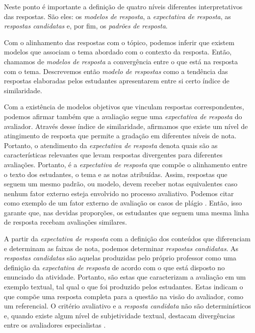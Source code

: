 Neste ponto é importante a definição de quatro níveis diferentes interpretativos das respostas. São eles: os \textit{modelos de resposta}, a \textit{expectativa de resposta}, as \textit{respostas candidatas} e, por fim, os \textit{padrões de resposta}. 


Com o alinhamento das respostas com o tópico, podemos inferir que existem modelos que associam o tema abordado com o contexto da resposta. Então, chamamos de \textit{modelos de resposta} a convergência entre o que está na resposta com o tema. Descrevemos então \textit{modelo de respostas} como a tendência das respostas elaboradas pelos estudantes apresentarem entre si certo índice de similaridade.

Com a existência de modelos objetivos que vinculam respostas correspondentes, podemos afirmar também que a avaliação segue uma \textit{expectativa de resposta} do avaliador. Através desse índice de similaridade, afirmamos que existe um nível de atingimento de resposta que permite a gradação em diferentes níveis de nota. Portanto, o atendimento da \textit{expectativa de resposta} denota quais são as características relevantes que levam respostas divergentes para  diferentes avaliações. Portanto, é a \textit{expectativa de resposta} que compõe o alinhamento entre o texto dos estudantes, o tema e as notas atribuídas. Assim, respostas que seguem um mesmo padrão, ou modelo, devem receber notas equivalentes caso nenhum fator externo esteja envolvido no processo avaliativo. Podemos citar como exemplo de um fator externo de avaliação os casos de plágio \cite{campana-filho2017}. Então, isso garante que, nas devidas proporções, os estudantes que seguem uma mesma linha de resposta recebam avaliações similares.

A partir da \textit{expectativa de resposta} com a definição dos conteúdos que diferenciam e determinam as faixas de nota, podemos determinar \textit{respostas candidatas}. As \textit{respostas candidatas} são aquelas produzidas pelo próprio professor como uma definição da \textit{expectativa de resposta} de acordo com o que está disposto no enunciado da atividade. Portanto, são estas que caracterizam a avaliação em um exemplo textual, tal qual o que foi produzido pelos estudantes. Estas indicam o que compõe uma resposta completa para a questão na visão do avaliador, como um referencial. O critério avaliativo e a \textit{resposta candidata} não são determinísticos e, quando existe algum nível de subjetividade textual, destacam divergências entre os avaliadores especialistas \cite{pado2021}.

